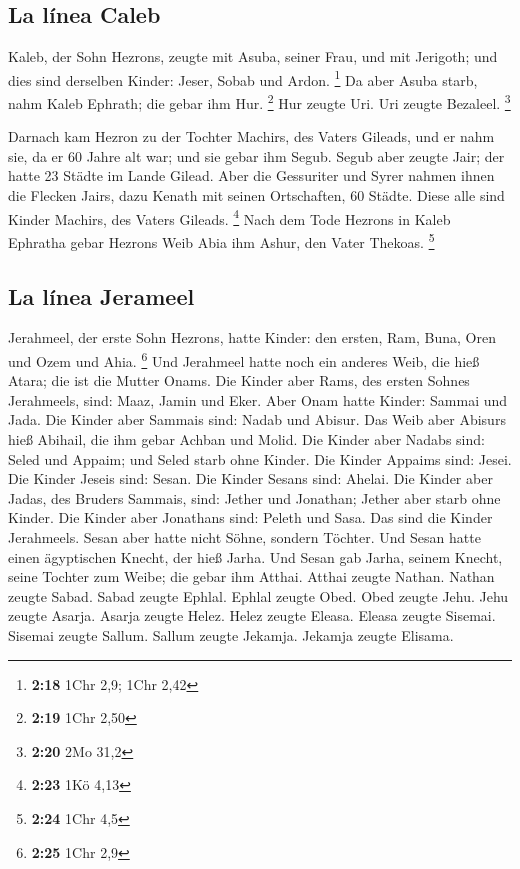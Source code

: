 \hypertarget{la-luxednea-caleb}{%
\subsection{La línea Caleb}\label{la-luxednea-caleb}}

 Kaleb, der Sohn Hezrons, zeugte mit Asuba, seiner Frau,
und mit Jerigoth; und dies sind derselben Kinder: Jeser, Sobab und
Ardon. \footnote{\textbf{2:18} 1Chr 2,9; 1Chr 2,42}  Da
aber Asuba starb, nahm Kaleb Ephrath; die gebar ihm Hur. \footnote{\textbf{2:19}
  1Chr 2,50}  Hur zeugte Uri. Uri zeugte Bezaleel.
\footnote{\textbf{2:20} 2Mo 31,2}

 Darnach kam Hezron zu der Tochter Machirs, des Vaters
Gileads, und er nahm sie, da er 60 Jahre alt war; und sie gebar ihm
Segub.  Segub aber zeugte Jair; der hatte 23 Städte im
Lande Gilead.  Aber die Gessuriter und Syrer nahmen ihnen
die Flecken Jairs, dazu Kenath mit seinen Ortschaften, 60 Städte. Diese
alle sind Kinder Machirs, des Vaters Gileads. \footnote{\textbf{2:23}
  1Kö 4,13}  Nach dem Tode Hezrons in Kaleb Ephratha
gebar Hezrons Weib Abia ihm Ashur, den Vater Thekoas. \footnote{\textbf{2:24}
  1Chr 4,5}

\hypertarget{la-luxednea-jerameel}{%
\subsection{La línea Jerameel}\label{la-luxednea-jerameel}}

 Jerahmeel, der erste Sohn Hezrons, hatte Kinder: den
ersten, Ram, Buna, Oren und Ozem und Ahia. \footnote{\textbf{2:25} 1Chr
  2,9}  Und Jerahmeel hatte noch ein anderes Weib, die
hieß Atara; die ist die Mutter Onams.  Die Kinder aber
Rams, des ersten Sohnes Jerahmeels, sind: Maaz, Jamin und Eker.
 Aber Onam hatte Kinder: Sammai und Jada. Die Kinder aber
Sammais sind: Nadab und Abisur.  Das Weib aber Abisurs
hieß Abihail, die ihm gebar Achban und Molid.  Die Kinder
aber Nadabs sind: Seled und Appaim; und Seled starb ohne Kinder.
 Die Kinder Appaims sind: Jesei. Die Kinder Jeseis sind:
Sesan. Die Kinder Sesans sind: Ahelai.  Die Kinder aber
Jadas, des Bruders Sammais, sind: Jether und Jonathan; Jether aber starb
ohne Kinder.  Die Kinder aber Jonathans sind: Peleth und
Sasa. Das sind die Kinder Jerahmeels.  Sesan aber hatte
nicht Söhne, sondern Töchter. Und Sesan hatte einen ägyptischen Knecht,
der hieß Jarha.  Und Sesan gab Jarha, seinem Knecht,
seine Tochter zum Weibe; die gebar ihm Atthai.  Atthai
zeugte Nathan. Nathan zeugte Sabad.  Sabad zeugte Ephlal.
Ephlal zeugte Obed.  Obed zeugte Jehu. Jehu zeugte
Asarja.  Asarja zeugte Helez. Helez zeugte Eleasa.
 Eleasa zeugte Sisemai. Sisemai zeugte Sallum.
 Sallum zeugte Jekamja. Jekamja zeugte Elisama.


